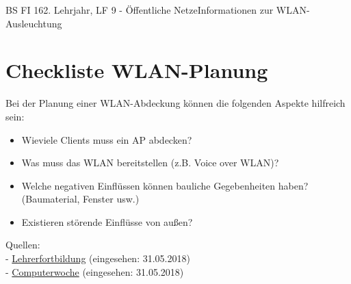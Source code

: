 \documentclass[11pt,twocolumn,oneside,openany,headings=optiontotoc,11pt,numbers=noenddot]{article}
\begin{document}
\begin{worksheet}{BS FI 16}{2. Lehrjahr, LF 9 - Öffentliche Netze}{Informationen zur WLAN-Ausleuchtung}
		\section*{Checkliste WLAN-Planung} Bei der Planung einer WLAN-Abdeckung können die folgenden Aspekte hilfreich sein:
		\begin{itemize}
			\item Wieviele Clients muss ein AP abdecken?
			\item Was muss das WLAN bereitstellen (z.B. Voice over WLAN)?
			\item Welche negativen Einflüssen können bauliche Gegebenheiten haben? (Baumaterial, Fenster usw.)
			\item Existieren störende Einflüsse von außen?
		\end{itemize}
		\par\bigskip\noindent
		\tiny{Quellen:\\
			- \href{https://lehrerfortbildung-bw.de/st_digital/tablet/anleitungen/infrastruktur/wlan/ausleuchtung.html}{Lehrerfortbildung} (eingesehen: 31.05.2018)\\
			- \href{https://www.computerwoche.de/a/die-kunst-der-optimalen-wlan-ausleuchtung,1225976}{Computerwoche} (eingesehen: 31.05.2018)}
	\end{worksheet}
\end{document}
